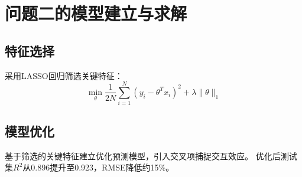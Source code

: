 \section{问题二的模型建立与求解}
\subsection{特征选择}
采用LASSO回归筛选关键特征：
\begin{equation}
\min_{\theta} \frac{1}{2N} \sum_{i=1}^{N} (y_i - \theta^T x_i)^2 + \lambda \|\theta\|_1
\end{equation}

\subsection{模型优化}
基于筛选的关键特征建立优化预测模型，引入交叉项捕捉交互效应。
优化后测试集$R^2$从0.896提升至0.923，RMSE降低约15\%。
